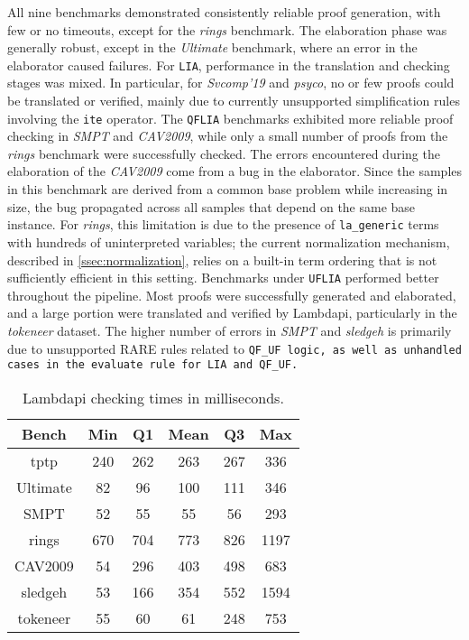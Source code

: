 All nine benchmarks demonstrated consistently reliable proof generation, with few or no timeouts, except for the \emph{rings} benchmark.
The elaboration phase was generally robust, except in the \emph{Ultimate} benchmark, where an error in the elaborator caused failures.
For \texttt{LIA}, performance in the translation and checking stages was mixed. In particular, for \emph{Svcomp'19} and \emph{psyco}, no or few proofs could be translated or verified, mainly due to currently unsupported simplification rules involving the \texttt{ite} operator.
The \texttt{QFLIA} benchmarks exhibited more reliable proof checking in \emph{SMPT} and \emph{CAV2009}, while only a small number of proofs from the \emph{rings} benchmark were successfully checked.
The errors encountered during the elaboration of the \emph{CAV2009} come from a bug in the elaborator. Since the samples in this benchmark are derived from a common base problem while increasing in size, the bug propagated across all samples that depend on the same base instance.
For \emph{rings}, this limitation is due to the presence of \texttt{la\_generic} terms with hundreds of uninterpreted variables; the current normalization mechanism, described in \cref{ssec:normalization}, relies on a built-in term ordering that is not sufficiently efficient in this setting.
Benchmarks under \texttt{UFLIA} performed better throughout the pipeline. Most proofs were successfully generated and elaborated, and a large portion were translated and verified by Lambdapi, particularly in the \emph{tokeneer} dataset.
The higher number of errors in \emph{SMPT} and \emph{sledgeh} is primarily due to unsupported RARE rules related to \tt{QF\_UF} logic, as well as unhandled cases in the \texttt{evaluate} rule for \texttt{LIA} and \texttt{QF\_UF}.

\begin{table}[t]
\centering
\begin{tabular}{|c|c|c|c|c|c|}
\hline
\textbf{Bench}      & \textbf{Min} & \textbf{Q1} & \textbf{Mean} & \textbf{Q3} & \textbf{Max} \\ \hline
tptp                & 240          & 262         & 263           & 267         & 336          \\ \hline
Ultimate            & 82           & 96          & 100           & 111         & 346          \\ \hline
SMPT                & 52           & 55          & 55            & 56          & 293          \\ \hline
rings               & 670          & 704         & 773           & 826         & 1197         \\ \hline
CAV2009           & 54           & 296         & 403           & 498         & 683          \\ \hline
sledgeh             & 53           & 166         & 354           & 552         & 1594         \\ \hline
tokeneer            & 55           & 60          & 61            & 248         & 753          \\ \hline
\end{tabular}
\caption{Lambdapi checking times in milliseconds.}
\label{table:benchmarks-list}
\end{table}

